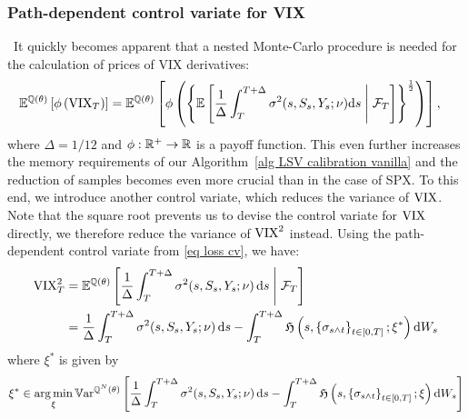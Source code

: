 \subsubsection{Path-dependent control variate for VIX}\
It quickly becomes apparent that a nested Monte-Carlo procedure is needed for the calculation of prices of VIX derivatives:
\begin{align*}
\mathbb{E}^{\mathbb{Q}(\theta)}\left[\phi\left(\mathrm{VIX}_T \right) \right] &= \mathbb{E}^{\mathbb{Q}(\theta)}\left[\phi \left( \left\{ \mathbb{E}\left[ \frac{1}{\Delta} \int_T^{T+\Delta} \sigma^2(s, S_s, Y_s; \nu) \mathrm{d} s \;\middle\vert\; \mathcal{F}_T \right] \right\}^\frac{1}{2}\right)\right],
\end{align*}
where $\Delta=1/12$ and $\phi: \mathbb{R}^+ \to \mathbb{R}$ is a payoff function. This even further increases the memory requirements of our Algorithm~\ref{alg LSV calibration vanilla} and the reduction of samples becomes even more crucial than in the case of SPX. To this end, we introduce another control variate, which reduces the variance of $\mathrm{VIX}$. Note that the square root prevents us to devise the control variate for $\mathrm{VIX}$ directly, we therefore reduce the variance of $\mathrm{VIX}^2$ instead. Using the path-dependent control variate from \eqref{eq loss cv}, we have:
\begin{align*}
\mathrm{VIX}^2_T &= \mathbb{E}^{\mathbb{Q}(\theta)}\left[ \frac{1}{\Delta} \int_T^{T+\Delta} \sigma^2(s, S_s, Y_s; \nu) \, \mathrm{d} s \;\middle\vert\; \mathcal{F}_T\right] \\
&= \frac{1}{\Delta} \int_{T}^{T+\Delta} \sigma^{2}(s, S_s, Y_s; \nu) \, \mathrm{d} s -\int_T^{T+\Delta} \mathfrak{H} \left(s, \left\{\sigma_{s \wedge t}\right\}_{t \in[0, T]} ; \xi^*\right) \mathrm{d} W_{s}
\end{align*}
where $\xi^*$ is given by
\[
\xi^* \in \operatorname*{arg\,min}_\xi \mathbb{V}\mathrm{ar}^{\mathbb{Q}^N(\theta)}\left[\frac{1}{\Delta} \int_{T}^{T+\Delta} \sigma^{2}(s, S_s, Y_s; \nu) \, \mathrm{d} s - \int_T^{T+\Delta} \mathfrak{H}\left(s, \left\{\sigma_{s\wedge t}\right\}_{t\in[0,T]}; \xi\right) \mathrm{d} W_{s} \right]
\]
